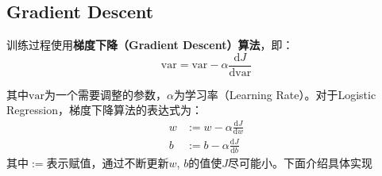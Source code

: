 \subsection{Gradient Descent}

训练过程使用\textbf{梯度下降（Gradient Descent）算法}，即：
\begin{equation}
	\mathrm{var} = \mathrm{var} - \alpha \frac{\mathrm{d}J}{\mathrm{d}\mathrm{var}} \label{eq:gradient}
\end{equation}

其中$\mathrm{var}$为一个需要调整的参数，$\alpha$为学习率（Learning Rate）。对于Logistic Regression，梯度下降算法的表达式为：
\begin{equation}
	\begin{aligned}
	w &:= w - \alpha \frac{\mathrm{d}J}{\mathrm{d}w} \\
	b &:= b - \alpha \frac{\mathrm{d}J}{\mathrm{d}b}
	\end{aligned} 
	\label{eq:gradient_logistic}
\end{equation}
其中$:=$表示赋值，通过不断更新$w$, $b$的值使$J$尽可能小。下面介绍具体实现

